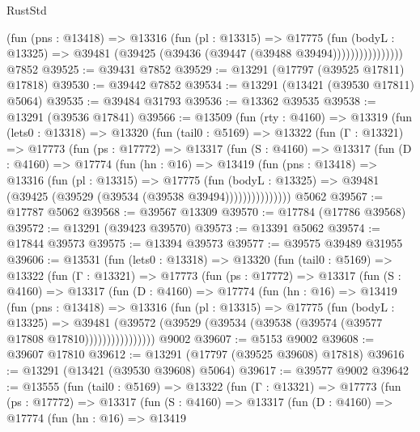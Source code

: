 \begin{lexlean}{RustStd}
\begin{coremodule}
                      (fun (pns : @13418) =>
                      @13316
                        (fun (pl : @13315) =>
                        @17775
                          (fun (bodyL : @13325) =>
                          @39481 (@39425 (@39436 (@39447 (@39488 @39494))))))))))))))))
    @7852
@39525 := @39431 @7852
@39529 := @13291 (@17797 (@39525 @17811) @17818)
@39530 := @39442 @7852
@39534 := @13291 (@13421 (@39530 @17811) @5064)
@39535 := @39484 @31793
@39536 := @13362 @39535
@39538 := @13291 (@39536 @17841)
@39566 := @13509
    (fun (rty : @4160) =>
    @13319
      (fun (lets0 : @13318) =>
      @13320
        (fun (tail0 : @5169) =>
        @13322
          (fun (Γ : @13321) =>
          @17773
            (fun (ps : @17772) =>
            @13317
              (fun (S : @4160) =>
              @13317
                (fun (D : @4160) =>
                @17774
                  (fun (hn : @16) =>
                  @13419
                    (fun (pns : @13418) =>
                    @13316
                      (fun (pl : @13315) =>
                      @17775
                        (fun (bodyL : @13325) =>
                        @39481 (@39425 (@39529 (@39534 (@39538 @39494)))))))))))))))
    @5062
@39567 := @17787 @5062
@39568 := @39567 @13309
@39570 := @17784 (@17786 @39568)
@39572 := @13291 (@39423 @39570)
@39573 := @13391 @5062
@39574 := @17844 @39573
@39575 := @13394 @39573
@39577 := @39575 @39489 @31955
@39606 := @13531
    (fun (lets0 : @13318) =>
    @13320
      (fun (tail0 : @5169) =>
      @13322
        (fun (Γ : @13321) =>
        @17773
          (fun (ps : @17772) =>
          @13317
            (fun (S : @4160) =>
            @13317
              (fun (D : @4160) =>
              @17774
                (fun (hn : @16) =>
                @13419
                  (fun (pns : @13418) =>
                  @13316
                    (fun (pl : @13315) =>
                    @17775
                      (fun (bodyL : @13325) =>
                      @39481
                        (@39572
                          (@39529 (@39534 (@39538 (@39574 (@39577 @17808 @17810))))))))))))))))
    @9002
@39607 := @5153 @9002
@39608 := @39607 @17810
@39612 := @13291 (@17797 (@39525 @39608) @17818)
@39616 := @13291 (@13421 (@39530 @39608) @5064)
@39617 := @39577 @9002
@39642 := @13555
    (fun (tail0 : @5169) =>
    @13322
      (fun (Γ : @13321) =>
      @17773
        (fun (ps : @17772) =>
        @13317
          (fun (S : @4160) =>
          @13317
            (fun (D : @4160) =>
            @17774
              (fun (hn : @16) =>
              @13419

\end{coremodule}
\end{lexlean}

